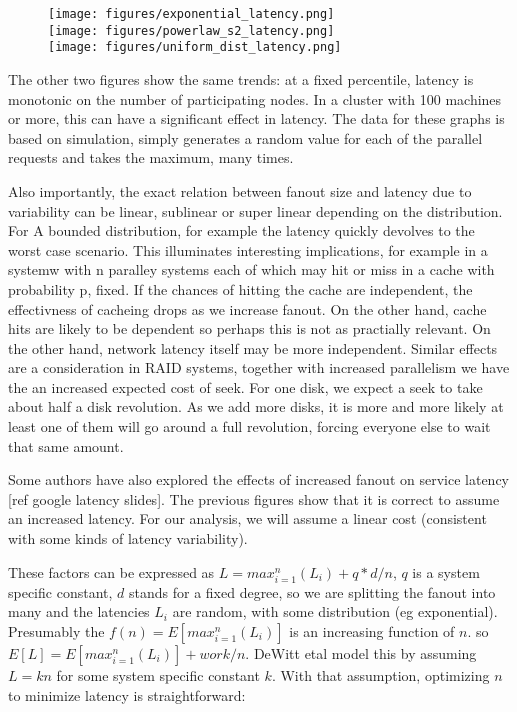 \begin{figure}
\texttt{[image: figures/exponential\_latency.png]}\\
\texttt{[image: figures/powerlaw\_s2\_latency.png]}\\
\texttt{[image: figures/uniform\_dist\_latency.png]}
\label{fig:fanout_effect}
\end{figure}

The other two figures show the same  trends: at a fixed percentile, latency is monotonic on  the number of participating nodes. In a cluster with 100 machines or more, this can have a significant effect in latency. The data for these graphs is based on simulation, simply generates a random value for each of the parallel requests and takes the maximum, many times. 

Also importantly, the exact relation between fanout size and latency due to variability can be linear, sublinear or super linear depending on the distribution. For A bounded distribution, for example the latency quickly devolves to the worst case scenario. This illuminates interesting implications, for example in a systemw with n paralley systems each of which may hit or miss in a cache with probability p, fixed. If the chances of hitting the cache are independent, the effectivness of cacheing drops as we increase fanout. On the other hand, cache hits are likely to be dependent so perhaps this is not as practially relevant. On the other hand, network latency itself may be more independent. Similar effects are a consideration in RAID systems, together with increased parallelism  we have the an increased expected cost of seek. For one disk, we expect a seek to take about half a disk revolution. As we add more disks, it is more and more likely at least one of them will go around a full revolution, forcing everyone else to wait that same amount.

Some authors have also explored the effects of increased fanout on service latency [ref google latency slides]. The previous figures show that it is correct to assume an increased latency. For our analysis, we will assume a linear cost (consistent with some kinds of latency variability). 

These factors can be expressed as \(L = max_{i=1}^n(L_i) + q*d/n\), \(q\) is a system specific constant, \(d\) stands for a fixed degree, so we are splitting the fanout into many and the latencies \(L_i\) are random, with some distribution (eg exponential). Presumably the \(f(n) = E[max_{i=1}^n(L_i)]\)  is an increasing function of \(n\). so \(E[L]  = E[max_{i=1}^n(L_i)] + work/n\). DeWitt etal  model this by  assuming \(L = kn\) for some system specific constant \(k\).  With that assumption, optimizing \(n\) to minimize latency is straightforward: 

